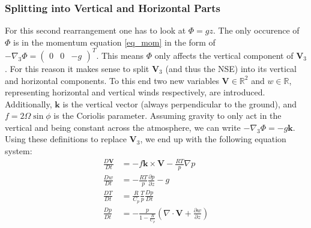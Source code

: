 \subsubsection{Splitting into Vertical and Horizontal Parts}
For this second rearrangement one has to look at $\Phi = gz$.
The only occurence of $\Phi$ is in the momentum equation \ref{eq_mom} in the form of $-\nabla _3 \Phi=\begin{pmatrix}0 & 0 & -g \end{pmatrix}^T $.
This means $\Phi$ only affects the vertical component of $\textbf{V}_3$.
For this reason it makes sense to split $\textbf{V}_3$ (and thus the NSE) into its vertical and horizontal components.
To this end two new variables $\textbf{V} \in \mathbb{R}^2$ and $w\in \mathbb{R}$, representing horizontal and vertical winds respectively, are introduced.
Additionally, $\boldsymbol{k}$ is the vertical vector (always perpendicular to the ground), and $f=2\Omega \sin \phi$ is the Coriolis parameter.
Assuming gravity to only act in the vertical and being constant across the atmosphere, we can write $-\nabla_3 \Phi = -g \boldsymbol{k}$.
Using these definitions to replace $\textbf{V}_3$, we end up with the following equation system:
\begin{align*}
\frac{D\textbf{V}}{Dt} &= -f\boldsymbol{k} \times \textbf{V} - \frac{RT}{p}\nabla p\\
\frac{Dw}{Dt} &= - \frac{RT}{p} \frac{\partial p}{\partial z} - g \\
\frac{DT}{Dt} &= \frac{R}{C_p}\frac{T}{p}\frac{Dp}{Dt}\\
\frac{Dp}{Dt} &= -\frac{p}{1- \frac{R}{C_p}} \left(\nabla \cdot \textbf{V} + \frac{\partial w}{\partial z}\right)
\end{align*}

